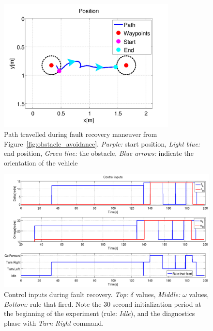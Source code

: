 \begin{figure}
\centering
\includegraphics[width=0.8\textwidth]{Files/Figures/faultrec_2016-06-21_14-26-34-position.png}
\caption[Path travelled during fault recovery]{Path travelled during fault recovery maneuver from Figure~\ref{fig:obstacle_avoidance}. \textit{Purple:} start position, \textit{Light blue:} end position, \textit{Green line:} the obstacle, \textit{Blue arrows:} indicate the orientation of the vehicle}
\label{fig:fault_recovery_path}
\end{figure}

\begin{figure}
\centering
\includegraphics[width=\textwidth]{Files/Figures/faultrec_2016-06-21_14-26-34_control_inputs.png}
\caption[Control inputs during fault recovery]{Control inputs during fault recovery. \textit{Top:} $\delta$ values, \textit{Middle:} $\omega$ values, \textit{Bottom:} rule that fired. Note the 30 second initialization period at the beginning of the experiment (rule: \textit{Idle}), and the diagnostics phase with \textit{Turn Right} command.}
\label{fig:fault_recovery_control_input}
\end{figure}


